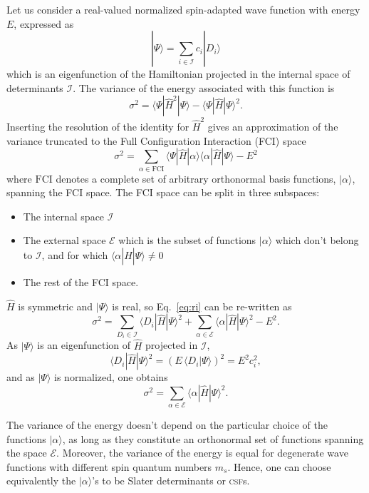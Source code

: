 \documentclass[aip,jcp,reprint,showkeys]{revtex4-1}
\newcommand{\ket}[1]{|#1\rangle}
\newcommand{\csf}{\textsc{csf}}
\newcommand{\mel}[3]{\langle #1 | #2 | #3 \rangle}
\begin{document}
Let us consider a real-valued normalized spin-adapted wave function with
energy $E$, expressed as
\begin{equation}
\ket{\Psi} = \sum_{i \in \mathcal{I}} c_i \ket{D_i}
\end{equation}
which is an eigenfunction of the Hamiltonian projected in the internal space of
determinants $\mathcal{I}$.
The variance of the energy associated with this function is
\begin{equation}
\sigma^2 = \mel{\Psi}{\hat{H}^2}{\Psi} - \mel{\Psi}{\hat{H}}{\Psi}^2 .
\end{equation}
Inserting the resolution of the identity for $\hat{H}^2$ gives an
approximation of the variance truncated to the Full Configuration Interaction (FCI) space
\begin{equation}
\sigma^2 = \sum_{\alpha \in \text{FCI}} \mel{\Psi}{\hat{H}}{\alpha} \mel{\alpha}{\hat{H}}{\Psi} - E^2
\label{eq:ri}
\end{equation}
where $\text{FCI}$ denotes a complete set of arbitrary orthonormal basis
functions, $\ket{\alpha}$, spanning the FCI space.
The FCI space can be split in three subspaces:
\begin{itemize}
\item The internal space $\mathcal{I}$
\item The external space $\mathcal{E}$ which is the subset of functions
      $\ket{\alpha}$ which don't belong to $\mathcal{I}$, and for which
      $\mel{\alpha}{\hat{H}}{\Psi} \ne 0$
\item The rest of the FCI space.
\end{itemize}
$\hat{H}$ is symmetric and $\ket{\Psi}$ is real, so Eq.~\eqref{eq:ri} can be
re-written as
\begin{equation}
\sigma^2 = \sum_{D_i    \in \mathcal{I}} \mel{D_i}{\hat{H}}{\Psi}^2 
         + \sum_{\alpha \in \mathcal{E}} \mel{\alpha}{\hat{H}}{\Psi}^2 - E^2.
\end{equation}
As $\ket{\Psi}$ is an eigenfunction of $\hat{H}$ projected in $\mathcal{I}$, 
\begin{equation}
\mel{D_i}{\hat{H}}{\Psi}^2 = \left( E\, \langle D_i | \Psi \rangle \right)^2 = E^2 c_i^2,
\end{equation}
and as $\ket{\Psi}$ is normalized, one obtains
\begin{equation}
\sigma^2 = \sum_{\alpha \in \mathcal{E}} \mel{\alpha}{\hat{H}}{\Psi}^2.
\end{equation} 

The variance of the energy doesn't depend on the particular choice of the
functions $\ket{\alpha}$, as long as they constitute an orthonormal set of
functions spanning the space $\mathcal{E}$. Moreover, the variance of the
energy is equal for degenerate wave functions with different spin quantum
numbers $m_s$.  Hence, one can choose equivalently the $\ket{\alpha}$'s to be
Slater determinants or \csf s.
\end{document}
